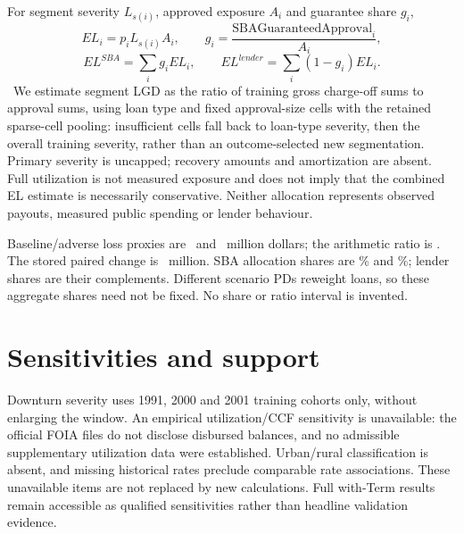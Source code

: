 For segment severity $L_{s(i)}$, approved exposure $A_i$ and guarantee share $g_i$,
\[EL_i=p_i L_{s(i)} A_i,\qquad g_i=\frac{\text{SBAGuaranteedApproval}_i}{A_i},\]
\[EL^{SBA}=\sum_i g_i EL_i,\qquad EL^{lender}=\sum_i(1-g_i)EL_i.\]
\losslabel\ We estimate segment LGD as the ratio of training gross charge-off sums to approval sums, using loan type and fixed approval-size cells with the retained sparse-cell pooling: insufficient cells fall back to loan-type severity, then the overall training severity, rather than an outcome-selected new segmentation. Primary severity is uncapped; recovery amounts and amortization are absent. Full utilization is not measured exposure and does not imply that the combined EL estimate is necessarily conservative. Neither allocation represents observed payouts, measured public spending or lender behaviour.


Baseline/adverse loss proxies are \ElBase\ and \ElAdverse\ million dollars; the arithmetic ratio is \ElRatio. The stored paired change is \ElDiff\ million. SBA allocation shares are \ShareBase\% and \ShareAdverse\%; lender shares are their complements. Different scenario PDs reweight loans, so these aggregate shares need not be fixed. No share or ratio interval is invented.

\section{Sensitivities and support}
Downturn severity uses 1991, 2000 and 2001 training cohorts only, without enlarging the window. An empirical utilization/CCF sensitivity is unavailable: the official FOIA files do not disclose disbursed balances, and no admissible supplementary utilization data were established. Urban/rural classification is absent, and missing historical rates preclude comparable rate associations. These unavailable items are not replaced by new calculations. Full with-Term results remain accessible as qualified sensitivities rather than headline validation evidence.

